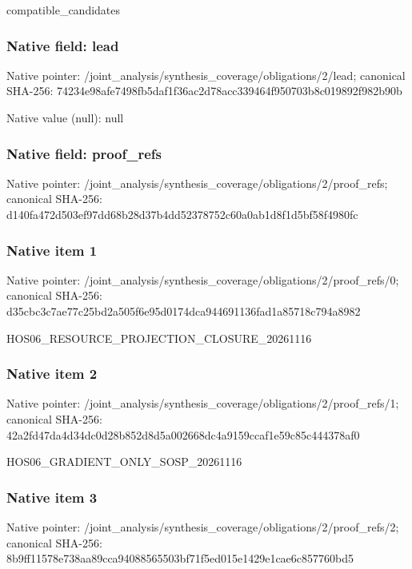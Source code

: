 \documentclass[10pt,a4paper]{article}
\begin{document}
\begingroup\raggedright\sloppy compatible\_\allowbreak{}candidates\par\endgroup

\subsubsection{Native field: lead}
Native pointer: /joint\_\allowbreak{}analysis/synthesis\_\allowbreak{}coverage/obligations/2/lead; canonical SHA-256: 74234e98afe7498fb5daf1f36ac2d78acc339464f950703b8c019892f982b90b

Native value (null): null

\subsubsection{Native field: proof\_\allowbreak{}refs}
Native pointer: /joint\_\allowbreak{}analysis/synthesis\_\allowbreak{}coverage/obligations/2/proof\_\allowbreak{}refs; canonical SHA-256: d140fa472d503ef97dd68b28d37b4dd52378752c60a0ab1d8f1d5bf58f4980fc

\subsubsection{Native item 1}
Native pointer: /joint\_\allowbreak{}analysis/synthesis\_\allowbreak{}coverage/obligations/2/proof\_\allowbreak{}refs/0; canonical SHA-256: d35cbc3c7ae77c25bd2a505f6e95d0174dca944691136fad1a85718c794a8982

\begingroup\raggedright\sloppy HOS06\_\allowbreak{}RESOURCE\_\allowbreak{}PROJECTION\_\allowbreak{}CLOSURE\_\allowbreak{}20261116\par\endgroup

\subsubsection{Native item 2}
Native pointer: /joint\_\allowbreak{}analysis/synthesis\_\allowbreak{}coverage/obligations/2/proof\_\allowbreak{}refs/1; canonical SHA-256: 42a2fd47da4d34dc0d28b852d8d5a002668dc4a9159ccaf1e59c85c444378af0

\begingroup\raggedright\sloppy HOS06\_\allowbreak{}GRADIENT\_\allowbreak{}ONLY\_\allowbreak{}SOSP\_\allowbreak{}20261116\par\endgroup

\subsubsection{Native item 3}
Native pointer: /joint\_\allowbreak{}analysis/synthesis\_\allowbreak{}coverage/obligations/2/proof\_\allowbreak{}refs/2; canonical SHA-256: 8b9ff11578e738aa89cca94088565503bf71f5ed015e1429e1cae6c857760bd5
\end{document}
